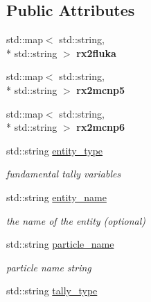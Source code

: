 \subsection*{Public Attributes}
\begin{DoxyCompactItemize}
\item 
\hypertarget{classpyne_1_1_tally_a451b6a2d7a0de5e54936f2274861cc0d}{std\-::map$<$ std\-::string, \\*
std\-::string $>$ {\bfseries rx2fluka}}\label{classpyne_1_1_tally_a451b6a2d7a0de5e54936f2274861cc0d}

\item 
\hypertarget{classpyne_1_1_tally_ae402f5aca5baea59ffc51f68e12e0d30}{std\-::map$<$ std\-::string, \\*
std\-::string $>$ {\bfseries rx2mcnp5}}\label{classpyne_1_1_tally_ae402f5aca5baea59ffc51f68e12e0d30}

\item 
\hypertarget{classpyne_1_1_tally_a6c2c0bad20d29a6b73110ae5610cd572}{std\-::map$<$ std\-::string, \\*
std\-::string $>$ {\bfseries rx2mcnp6}}\label{classpyne_1_1_tally_a6c2c0bad20d29a6b73110ae5610cd572}

\item 
std\-::string \hyperlink{classpyne_1_1_tally_a8b2e517c759ca71bc7b25c4de5a412f9}{entity\-\_\-type}
\begin{DoxyCompactList}\small\item\em fundamental tally variables \end{DoxyCompactList}\item 
\hypertarget{classpyne_1_1_tally_ac7892546a42be1385f0e805638a124b1}{std\-::string \hyperlink{classpyne_1_1_tally_ac7892546a42be1385f0e805638a124b1}{entity\-\_\-name}}\label{classpyne_1_1_tally_ac7892546a42be1385f0e805638a124b1}

\begin{DoxyCompactList}\small\item\em the name of the entity (optional) \end{DoxyCompactList}\item 
\hypertarget{classpyne_1_1_tally_af79d35607aeb81e366f76ab75e2bfda0}{std\-::string \hyperlink{classpyne_1_1_tally_af79d35607aeb81e366f76ab75e2bfda0}{particle\-\_\-name}}\label{classpyne_1_1_tally_af79d35607aeb81e366f76ab75e2bfda0}

\begin{DoxyCompactList}\small\item\em particle name string \end{DoxyCompactList}\item 
\hypertarget{classpyne_1_1_tally_ae5944106656a49e0f7f525e75acaa4b2}{std\-::string \hyperlink{classpyne_1_1_tally_ae5944106656a49e0f7f525e75acaa4b2}{tally\-\_\-type}}\label{classpyne_1_1_tally_ae5944106656a49e0f7f525e75acaa4b2}


\end{DoxyCompactItemize}
